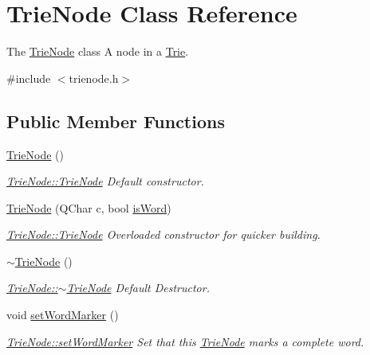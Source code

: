 \hypertarget{class_trie_node}{\section{Trie\-Node Class Reference}
\label{class_trie_node}
}


The \hyperlink{class_trie_node}{Trie\-Node} class A node in a \hyperlink{class_trie}{Trie}.  




{\ttfamily \#include $<$trienode.\-h$>$}

\subsection*{Public Member Functions}
\begin{DoxyCompactItemize}
\item 
\hyperlink{class_trie_node_a3c44872f26b52fa29a38c91e69b22103}{Trie\-Node} ()
\begin{DoxyCompactList}\small\item\em \hyperlink{class_trie_node_a3c44872f26b52fa29a38c91e69b22103}{Trie\-Node\-::\-Trie\-Node} Default constructor. \end{DoxyCompactList}\item 
\hyperlink{class_trie_node_a6bd6d1a202d5e3eed86ddb6d2260348c}{Trie\-Node} (Q\-Char c, bool \hyperlink{class_trie_node_a3fa48afcb9376feaf24c9d8acac7c076}{is\-Word})
\begin{DoxyCompactList}\small\item\em \hyperlink{class_trie_node_a3c44872f26b52fa29a38c91e69b22103}{Trie\-Node\-::\-Trie\-Node} Overloaded constructor for quicker building. \end{DoxyCompactList}\item 
\hyperlink{class_trie_node_a2c338a9960c601bbe654668cbe4f18a5}{$\sim$\-Trie\-Node} ()
\begin{DoxyCompactList}\small\item\em \hyperlink{class_trie_node_a2c338a9960c601bbe654668cbe4f18a5}{Trie\-Node\-::$\sim$\-Trie\-Node} Default Destructor. \end{DoxyCompactList}\item 
void \hyperlink{class_trie_node_a402a938aeaf7f2b4dcd573e1949c55d4}{set\-Word\-Marker} ()
\begin{DoxyCompactList}\small\item\em \hyperlink{class_trie_node_a402a938aeaf7f2b4dcd573e1949c55d4}{Trie\-Node\-::set\-Word\-Marker} Set that this \hyperlink{class_trie_node}{Trie\-Node} marks a complete word. \end{DoxyCompactList}\item 

\end{DoxyCompactItemize}
